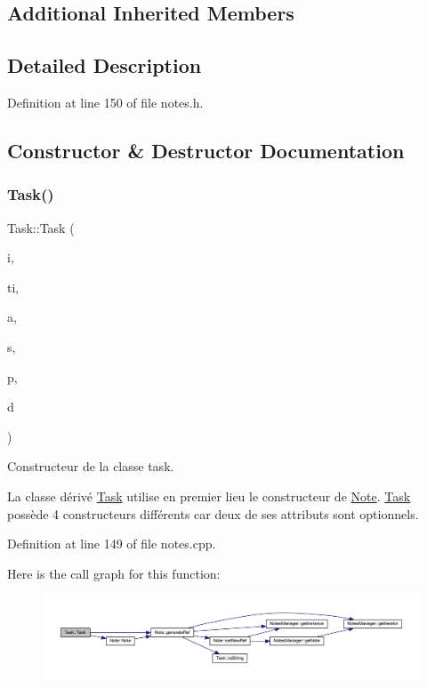 \subsection*{Additional Inherited Members}


\subsection{Detailed Description}


Definition at line 150 of file notes.\+h.



\subsection{Constructor \& Destructor Documentation}
\mbox{\label{class_task_a08a0f57803d8ef35f687f23f759e9f0c}} 
\subsubsection{\texorpdfstring{Task()}{Task()}}
{\footnotesize\ttfamily Task\+::\+Task (\begin{DoxyParamCaption}\item[{const Q\+String \&}]{i,  }\item[{const Q\+String \&}]{ti,  }\item[{const Q\+String \&}]{a,  }\item[{E\+N\+U\+M\+::\+Status\+Type}]{s,  }\item[{unsigned int}]{p,  }\item[{const Q\+Date\+Time}]{d }\end{DoxyParamCaption})}



Constructeur de la classe task. 

La classe dérivé \hyperlink{class_task}{Task} utilise en premier lieu le constructeur de \hyperlink{class_note}{Note}. \hyperlink{class_task}{Task} possède 4 constructeurs différents car deux de ses attributs sont optionnels. 

Definition at line 149 of file notes.\+cpp.

Here is the call graph for this function\+:\nopagebreak
\begin{figure}[H]
\begin{center}
\leavevmode
\includegraphics[width=350pt]{class_task_a08a0f57803d8ef35f687f23f759e9f0c_cgraph}
\end{center}
\end{figure}


